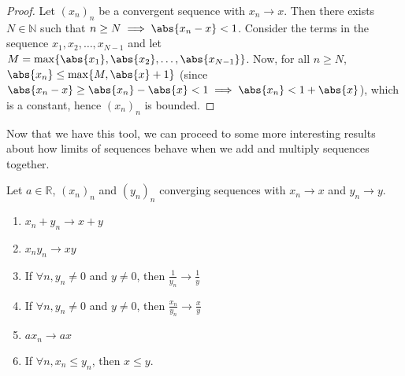 \documentclass[../real_analysis.tex]{subfiles}
\begin{document}
        \begin{proof}
            Let $(x_n)_n$ be a convergent sequence with $x_n\to x$. Then there exists $N\in\mathbb{N}$ such that $n\geq N\implies\abs{x_n-x}<1$. Consider the terms in the sequence $x_1, x_2,\dots,x_{N-1}$ and let $M=\max\{\abs{x_1},\abs{x_2},\dots,\abs{x_{N-1}}\}$.
            Now, for all $n\geq N$, $\abs{x_n}\leq\max\{M, \abs{x}+1\}$ (since $\abs{x_n-x}\geq\abs{x_n}-\abs{x}<1\implies\abs{x_n}<1+\abs{x}$), which is a constant, hence $(x_n)_n$ is bounded.
        \end{proof}
        Now that we have this tool, we can proceed to some more interesting results about how limits of sequences behave when we add and multiply sequences together.
        \begin{theorem}\label{seq-lim-props}
            Let $a\in\mathbb{R}$, $(x_n)_n$ and $(y_n)_n$ converging sequences with $x_n\to x$ and $y_n\to y$.
            \begin{enumerate}[label={\upshape(\roman*)}]
                \item $x_n+y_n\to x+y$
                \item $x_ny_n\to xy$
                \item If $\forall n, y_n\neq0$ and $y\neq0$, then $\frac{1}{y_n}\to\frac{1}{y}$
                \item If $\forall n, y_n\neq0$ and $y\neq0$, then $\frac{x_n}{y_n}\to\frac{x}{y}$
                \item $ax_n\to ax$
                \item If $\forall n, x_n\leq y_n$, then $x\leq y$.
            \end{enumerate}
        \end{theorem}
\end{document}
